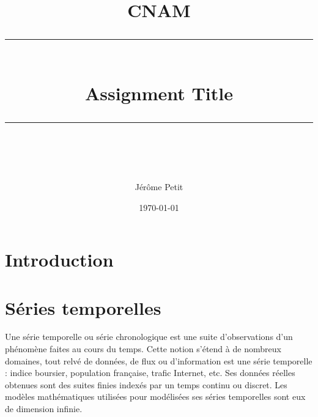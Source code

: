 \documentclass[11pt]{scrartcl} %
\title{	
	\normalfont\normalsize
	\textsc{CNAM}\\ %
	\vspace{25pt} %
	\rule{\linewidth}{0.5pt}\\ %
	\vspace{20pt} %
	{\huge Assignment Title}\\ %
	\vspace{12pt} %
	\rule{\linewidth}{2pt}\\ %
	\vspace{12pt} %
}
\author{\LARGE Jérôme Petit} %
\date{\normalsize\today} %
\begin{document}
\maketitle %

%
\section{Introduction}


\section{Séries temporelles}
Une série temporelle ou série chronologique est une suite d’observations d’un phénomène faites au cours du temps. Cette notion s'étend à de nombreux domaines, tout relvé de données, de flux ou d'information est une série temporelle : indice boursier, population française, trafic Internet, etc. Ses données réelles obtenues sont des suites finies indexés par un temps continu ou discret. Les modèles mathématiques utilisées pour modélisées ses séries temporelles sont eux de dimension infinie.
\end{document}
